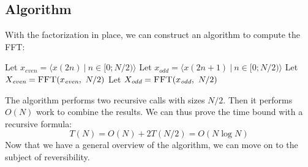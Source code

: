 \subsection{Algorithm}
With the factorization in place,
we can construct an algorithm to compute the FFT:

\begin{algorithm}[H]
    \DontPrintSemicolon
    \caption{$\textsc{FFT}(x, N)$}
    Let $x_\textit{even} = \langle x(2n) ~|~ n \in [0;N/2) \rangle$\;
    Let $x_\textit{odd} = \langle x(2n + 1) ~|~ n \in [0;N/2) \rangle$\;
    Let $X_\textit{even} = \textsc{FFT}(x_\textit{even}, ~N/2)$\;
    Let $X_\textit{odd} = \textsc{FFT}(x_\textit{odd}, ~N/2)$\;
\end{algorithm}

The algorithm performs two recursive calls with sizes $N/2$.
Then it performs $O(N)$ work to combine the results.
We can thus prove the time bound with a recursive formula:
\begin{equation}
    T(N) = O(N) + 2T(N/2) = O(N \log N)
\end{equation}
Now that we have a general overview of the algorithm,
we can move on to the subject of reversibility.
